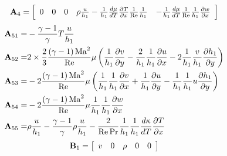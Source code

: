 \begin{equation*}
  {\bf{A}}_4  = \left[ {\begin{array}{*{20}c}
   0 & 0 & 0 & {\rho \frac{u}{{h_1 }} - \frac{1}{{h_1 }}\frac{{d\mu }}{{dT}}\frac{{\partial T}}{{\partial x}}\frac{1}{{{\mathop{\rm Re}\nolimits} }}\frac{1}{{h_1 }}} & { - \frac{1}{{h_1 }}\frac{{d\mu }}{{dT}}\frac{1}{{{\mathop{\rm Re}\nolimits} }}\frac{1}{{h_1 }}\frac{{\partial w}}{{\partial x}}}  \\
\end{array}} \right]
\end{equation*} 
\begin{equation*}
  \begin{aligned}
    {\bf{A}}_{51}  =& - \frac{{\gamma  - 1}}{\gamma }T\frac{u}{{h_1 }}\\
    {\bf{A}}_{52}  =& 2 \times \frac{{\rm{2}}}{3}\frac{{\left( {\gamma  - 1} \right){\rm{Ma}}^2 }}{{{\mathop{\rm Re}\nolimits} }}\mu \left( {\frac{1}{{h_1 }}\frac{{\partial v}}{{\partial y}} - \frac{2}{{h_1 }}\frac{1}{{h_1 }}\frac{{\partial u}}{{\partial x}} - 2\frac{1}{{h_1 }}\frac{v}{{h_1 }}\frac{{\partial h_1 }}{{\partial y}}} \right)\\
    {\bf{A}}_{53}  =& - 2\frac{{\left( {\gamma  - 1} \right){\rm{Ma}}^2 }}{{{\mathop{\rm Re}\nolimits} }}\mu \left( {\frac{1}{{h_1 }}\frac{1}{{h_1 }}\frac{{\partial v}}{{\partial x}} + \frac{1}{{h_1 }}\frac{{\partial u}}{{\partial y}} - \frac{1}{{h_1 }}\frac{1}{{h_1 }}u\frac{{\partial h_1 }}{{\partial y}}} \right)\\
    {\bf{A}}_{54}  =& - 2\frac{{\left( {\gamma  - 1} \right){\rm{Ma}}^2 }}{{{\mathop{\rm Re}\nolimits} }}\mu \frac{1}{{h_1 }}\frac{1}{{h_1 }}\frac{{\partial w}}{{\partial x}}\\
    {\bf{A}}_{55}  =& \rho \frac{u}{{h_1 }} - \frac{{\gamma  - 1}}{\gamma }\rho \frac{u}{{h_1 }} - \frac{2}{{{\mathop{\rm Re}\nolimits} \Pr }}\frac{1}{{h_1 }}\frac{1}{{h_1 }}\frac{{d\kappa }}{{dT}}\frac{{\partial T}}{{\partial x}}
  \end{aligned}
\end{equation*} 
\begin{equation*}
  {\bf{B}}_1  = \left[ {\begin{array}{*{20}c}
   v & 0 & \rho  & 0 & 0  \\
\end{array}} \right]
\end{equation*}
